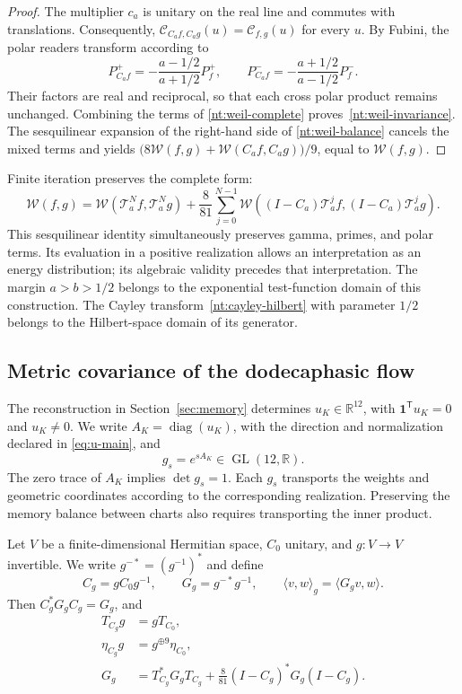 \begin{proof}
The multiplier \(c_a\) is unitary on the real line and
commutes with translations. Consequently,
\(\mathcal C_{C_af,C_ag}(u)=\mathcal C_{f,g}(u)\)
for every \(u\). By Fubini, the polar readers transform
according to
\[
 P_{C_af}^+
 =-\frac{a-1/2}{a+1/2}P_f^+,\qquad
 P_{C_af}^-
 =-\frac{a+1/2}{a-1/2}P_f^-.
\]
Their factors are real and reciprocal, so that
each cross polar product remains unchanged.
Combining the terms of
\eqref{nt:weil-complete} proves~\eqref{nt:weil-invariance}.
The sesquilinear expansion of the right-hand side of
\eqref{nt:weil-balance} cancels the mixed terms and
yields
\(\bigl(8\mathscr W(f,g)+
\mathscr W(C_af,C_ag)\bigr)/9\), equal to
\(\mathscr W(f,g)\).
\end{proof}

Finite iteration preserves the complete form:
\[
 \mathscr W(f,g)
 =\mathscr W(\mathcal T_a^Nf,\mathcal T_a^Ng)
 +\frac8{81}\sum_{j=0}^{N-1}
 \mathscr W((I-C_a)\mathcal T_a^jf,
            (I-C_a)\mathcal T_a^jg).
\]
This sesquilinear identity simultaneously preserves
gamma, primes, and polar terms. Its evaluation in a
positive realization allows an interpretation as an energy
distribution; its algebraic validity precedes that
interpretation. The margin \(a>b>1/2\) belongs to the
exponential test-function domain of this construction.
The Cayley transform~\eqref{nt:cayley-hilbert} with parameter \(1/2\)
belongs to the Hilbert-space domain of its generator.

\subsection{Metric covariance of the dodecaphasic flow}

The reconstruction in Section~\ref{sec:memory} determines
\(u_K\in\mathbb R^{12}\), with
\(\mathbf1^{\mathsf T}u_K=0\) and \(u_K\ne0\).
We write \(A_K=\operatorname{diag}(u_K)\), with the direction and
normalization declared in \eqref{eq:u-main}, and
\[
 g_s=e^{sA_K}\in\operatorname{GL}(12,\mathbb R).
\]
The zero trace of \(A_K\) implies \(\det g_s=1\).
Each \(g_s\) transports the weights and geometric
coordinates according to the corresponding realization.
Preserving the memory balance between charts
also requires transporting the inner product.

\begin{proposition}
Let \(V\) be a finite-dimensional Hermitian space, \(C_0\) unitary,
and \(g:V\to V\) invertible. We write
\(g^{-*}=(g^{-1})^*\) and define
\begin{equation}
 C_g=gC_0g^{-1},\qquad
 G_g=g^{-*}g^{-1},\qquad
 \langle v,w\rangle_g=\langle G_gv,w\rangle.
 \label{nt:metric-chart}
\end{equation}
Then \(C_g^*G_gC_g=G_g\), and
\begin{align}
 T_{C_g}g&=gT_{C_0},\label{nt:metric-naturality}\\
 \eta_{C_g}g&=g^{\oplus9}\eta_{C_0},\label{nt:eta-naturality}\\
 G_g&=T_{C_g}^*G_gT_{C_g}
 +\frac8{81}(I-C_g)^*G_g(I-C_g).\label{nt:metric-balance}
\end{align}
\end{proposition}

